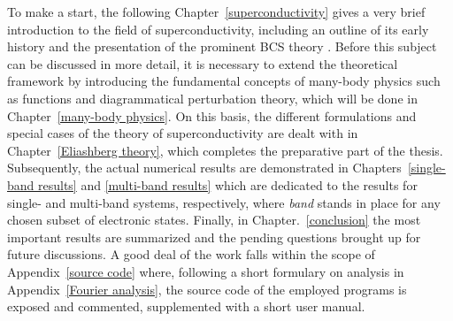 To make a start, the following Chapter~\ref{superconductivity} gives a very
brief introduction to the field of superconductivity, including an outline of
its early history and the presentation of the prominent BCS theory \cites
{BardeenCooperSchrieffer57a} {BardeenCooperSchrieffer57b}. Before this subject
can be discussed in more detail, it is necessary to extend the theoretical
framework by introducing the fundamental concepts of many-body physics such as
 functions and diagrammatical perturbation theory, which will be
done in Chapter~\ref{many-body physics}. On this basis, the different
formulations and special cases of the  theory of
superconductivity are dealt with in Chapter~\ref{Eliashberg theory}, which
completes the preparative part of the thesis. Subsequently, the actual numerical
results are demonstrated in Chapters~\ref{single-band results} and
\ref{multi-band results} which are dedicated to the results for single- and
multi-band systems, respectively, where \emph{band} stands in place for any
chosen subset of electronic states. Finally, in Chapter.~\ref{conclusion} the
most important results are summarized and the pending questions brought up for
future discussions. A good deal of the work falls within the scope of
Appendix~\ref{source code} where, following a short formulary on 
analysis in Appendix~\ref{Fourier analysis}, the source code of the employed
programs is exposed and commented, supplemented with a short user manual.

